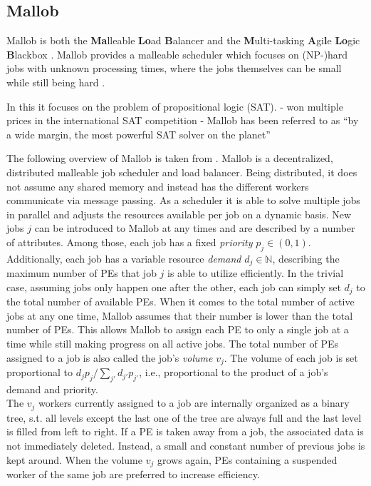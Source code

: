 \subsection{Mallob}
\label{prelim: mallob}
Mallob is both the \textbf{Ma}lleable \textbf{Lo}ad \textbf{B}alancer and the \textbf{M}ulti-tasking \textbf{A}gi\textbf{l}e \textbf{Lo}gic \textbf{B}lackbox \cite{schreiber2021scalable}.
Mallob provides a malleable scheduler which focuses on (NP-)hard jobs with unknown processing times, where the jobs themselves can be small while still being hard \cite{sanders2022decentralized}.

\todo{}
In this it focuses on the problem of propositional logic (SAT).
- won multiple prices in the international SAT competition
- Mallob has been referred to as “by a wide margin, the most powerful SAT solver on the planet”

The following overview of Mallob is taken from \cite{schreiber2021scalable}.
Mallob is a decentralized, distributed malleable job scheduler and load balancer. Being distributed, it does not assume any shared memory and instead has the different workers communicate via message passing.
As a scheduler it is able to solve multiple jobs in parallel and adjusts the resources available per job on a dynamic basis. New jobs $j$ can be introduced to Mallob at any times and are described by a number of attributes. Among those, each job has a fixed \textit{priority} $p_j \in (0, 1)$. Additionally, each job has a variable resource \textit{demand} $d_j \in \mathbb{N}$, describing the maximum number of PEs that job $j$ is able to utilize efficiently. In the trivial case, assuming jobs only happen one after the other, each job can simply set $d_j$ to the total number of available PEs. When it comes to the total number of active jobs at any one time, Mallob assumes that their number is lower than the total number of PEs. This allows Mallob to assign each PE to only a single job at a time while still making progress on all active jobs. The total number of PEs assigned to a job is also called the job's \textit{volume} $v_j$. The volume of each job is set proportional to $d_j p_j / \sum_{j'} d_{j'} p_{j'}$, i.e., proportional to the product of a job's demand and priority.\\
The $v_j$ workers currently assigned to a job are internally organized as a binary tree, s.t. all levels except the last one of the tree are always full and the last level is filled from left to right. If a PE is taken away from a job, the associated data is not immediately deleted. Instead, a small and constant number of previous jobs is kept around. When the volume $v_j$ grows again, PEs containing a suspended worker of the same job are preferred to increase efficiency.

